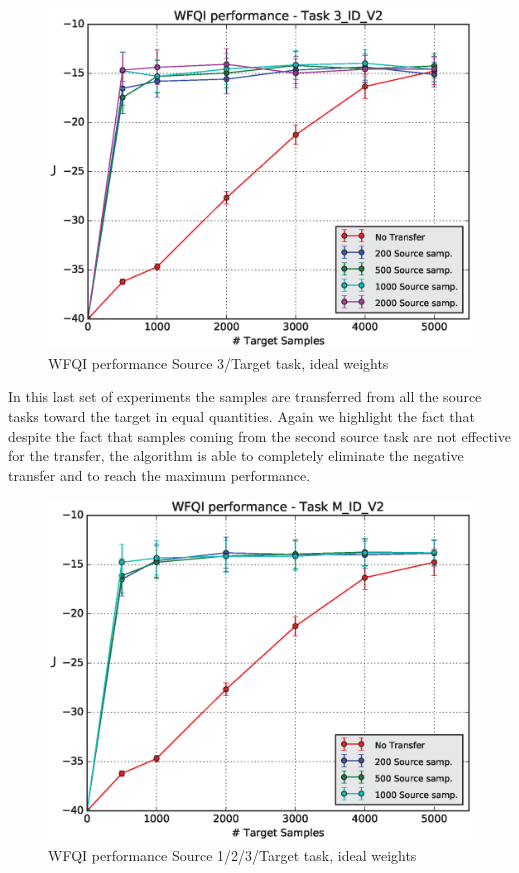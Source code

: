     \begin{figure}[H]
      \raggedbottom
      \centering
      \includegraphics[scale=0.5]{images/WFQIPerf3_ID_V2.eps}
      \caption{WFQI performance Source 3/Target task, ideal weights}
      \label{perf3E}
    \end{figure}

    \noindent In this last set of experiments the samples are transferred from all
    the source tasks toward the target in equal quantities. Again we highlight the
    fact that despite the fact that samples coming from the second source task
    are not effective for the transfer, the algorithm is able to completely
    eliminate the negative transfer and to reach the maximum performance.

    \begin{figure}[H]
      \raggedbottom
      \centering
      \includegraphics[scale=0.5]{images/WFQIPerfM_ID_V2.eps}
      \caption{WFQI performance Source 1/2/3/Target task, ideal weights}
      \label{perfMIDV2}
    \end{figure}

